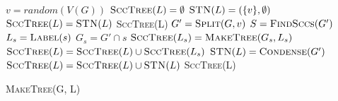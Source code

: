 \begin{algorithm}[H]
    \SetAlgoLined
    $v = random(V(G))$\;
    $\textsc{SccTree}(L) = \emptyset$\;
     {
        $\textsc{STN}(L) = (\{v\}, \emptyset)$\;
        $\textsc{SccTree}(L) = \textsc{STN}(L)$\;
        \Return \textsc{SccTree}(L)\;
    }
    $G' = \textsc{Split}(G, v)$\;
    $S = \textsc{FindSccs}(G')$\;
     {
        $L_s = \textsc{Label}(s)$\;
        $G_s = G' \cap s$\;
        $\textsc{SccTree}(L_s) = \textsc{MakeTree}(G_s, L_s)$\;
        $\textsc{SccTree}(L) = \textsc{SccTree}(L) \cup \textsc{SccTree}(L_s)$\;
    }
    $\textsc{STN}(L) = \textsc{Condense}(G')$\;
    $\textsc{SccTree}(L) = \textsc{SccTree}(L) \cup \textsc{STN}(L)$\;
    \Return \textsc{SccTree}(L)\;

    \caption{\textsc{MakeTree(G, L)}}
\end{algorithm}

